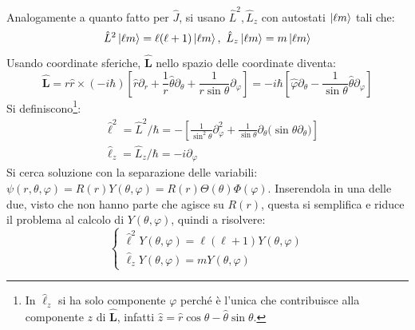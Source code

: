 \documentclass[11pt, a4paper]{scrartcl} %
\numberwithin{equation}{subsection}
\theoremstyle{style2}
\theoremstyle{style1}
\begin{document}
Analogamente a quanto fatto per $\hat{J}$, si usano $\hat{L}^2, \hat{L}_z$ con autostati $\ket{\ell m} $ tali che:
\[
\hat{L}^2 \ket{\ell m} = \ell (\ell +1) \ket{\ell m} , \ \hat{L}_z \ket{\ell m}  = m \ket{\ell m} 
\] 
Usando coordinate sferiche, $\hat{\mathbf{L}}$ nello spazio delle coordinate diventa:
\[
	\hat{\mathbf{L} } = r \hat{r} \times (-i\hbar ) \left[ \hat{r} \partial _r + \frac{1}{r} \hat{\theta } \partial _\theta + \frac{1}{r \sin \theta } \partial _\varphi \right] = -i \hbar  \left[ \hat{\varphi } \partial _\theta - \frac{1}{\sin \theta } \hat{\theta } \partial _\varphi  \right] 
\] 
Si definiscono\footnote{In $\hat{\ell }_z$ si ha solo componente $\varphi $ perch\'e \`e l'unica che contribuisce alla componente $z$ di $\hat{\mathbf{L} }$, infatti $\hat{z} = \hat{r}\cos \theta   -  \hat{ \theta }\sin \theta  $.}:
\begin{equation}\label{lL}
\begin{split}
	& \hat{\ell }^2 = \hat{L}^2 / \hbar = - \left[ \frac{1}{\sin^2 \theta } \partial ^2 _\varphi + \frac{1}{\sin \theta } \partial _\theta  \big(\sin \theta \partial _\theta \big) \right] \\
	& \hat{\ell }_z = \hat{L}_z / \hbar = - i \partial _\varphi 
\end{split}
\end{equation}
Si cerca soluzione con la separazione delle variabili: $\psi (r,\theta ,\varphi ) = R(r) Y(\theta ,\varphi ) = R(r) \Theta(\theta ) \Phi (\varphi )$. Inserendola in una delle due, visto che non hanno parte che agisce su $R(r)$, questa si semplifica e riduce il problema al calcolo di $Y(\theta ,\varphi )$, quindi a risolvere:
\begin{equation}
	\begin{cases}
		\hat{\ell }^2 Y(\theta ,\varphi ) = \ell (\ell +1) Y(\theta ,\varphi )\\
		\hat{\ell }_z Y(\theta ,\varphi ) = m Y(\theta ,\varphi )
	\end{cases}
\end{equation}
\end{document}
